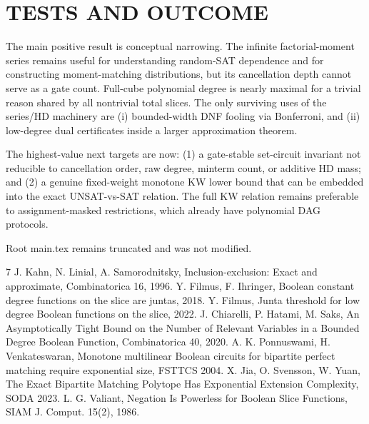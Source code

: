 \documentclass[11pt]{article}
\begin{document}
\section{TESTS AND OUTCOME}
The main positive result is conceptual narrowing. The infinite factorial-moment series remains useful for understanding random-SAT dependence and for constructing moment-matching distributions, but its cancellation depth cannot serve as a gate count. Full-cube polynomial degree is nearly maximal for a trivial reason shared by all nontrivial total slices. The only surviving uses of the series/HD machinery are (i) bounded-width DNF fooling via Bonferroni, and (ii) low-degree dual certificates inside a larger approximation theorem.

The highest-value next targets are now: (1) a gate-stable set-circuit invariant not reducible to cancellation order, raw degree, minterm count, or additive HD mass; and (2) a genuine fixed-weight monotone KW lower bound that can be embedded into the exact UNSAT-vs-SAT relation. The full KW relation remains preferable to assignment-masked restrictions, which already have polynomial DAG protocols.

Root main.tex remains truncated and was not modified.

\begin{thebibliography}{7}
 J. Kahn, N. Linial, A. Samorodnitsky, Inclusion-exclusion: Exact and approximate, Combinatorica 16, 1996.
 Y. Filmus, F. Ihringer, Boolean constant degree functions on the slice are juntas, 2018.
 Y. Filmus, Junta threshold for low degree Boolean functions on the slice, 2022.
 J. Chiarelli, P. Hatami, M. Saks, An Asymptotically Tight Bound on the Number of Relevant Variables in a Bounded Degree Boolean Function, Combinatorica 40, 2020.
 A. K. Ponnuswami, H. Venkateswaran, Monotone multilinear Boolean circuits for bipartite perfect matching require exponential size, FSTTCS 2004.
 X. Jia, O. Svensson, W. Yuan, The Exact Bipartite Matching Polytope Has Exponential Extension Complexity, SODA 2023.
 L. G. Valiant, Negation Is Powerless for Boolean Slice Functions, SIAM J. Comput. 15(2), 1986.
\end{thebibliography}
\end{document}
